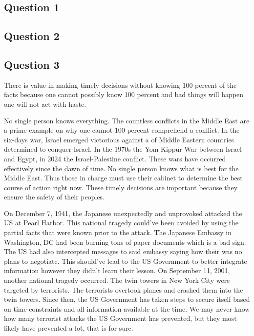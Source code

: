 \documentclass[10pt]{article}
\begin{document}
\subsection{Question 1}

\subsection{Question 2}

\subsection{Question 3}

There is value in making timely decisions without knowing 100 percent of the facts because one cannot possibly know 100 percent and bad things will happen one will not act with haste.

No single person knows everything. The countless conflicts in the Middle East are a prime example on why one cannot 100 percent comprehend a conflict. In the six-days war, Israel emerged victorious against a of Middle Eastern countries determined to conquer Israel. In the 1970s the Yom Kippur War between Israel and Egypt, in 2024 the Israel-Palestine conflict. These wars have occurred effectively since the dawn of time. No single person knows what is best for the Middle East. Thus those in charge must use their cabinet to determine the best course of action right now. These timely decisions are important because they ensure the safety of their peoples.

On December 7, 1941, the Japanese unexpectedly and unprovoked attacked the US at Pearl Harbor. This national tragedy could've been avoided by using the partial facts that were known prior to the attack. The Japanese Embassy in Washington, DC had been burning tons of paper documents which is a bad sign. The US had also intercepted messages to said embassy saying how their was no plans to negotiate. This should've lead to the US Government to better integrate information however they didn't learn their lesson. On September 11, 2001, another national tragedy occurred. The twin towers in New York City were targeted by terrorists. The terrorists overtook planes and crashed them into the twin towers. Since then, the US Government has taken steps to secure itself based on time-constraints and all information available at the time. We may never know how many terrorist attacks the US Government has prevented, but they most likely have prevented a lot, that is for sure.
\end{document}
